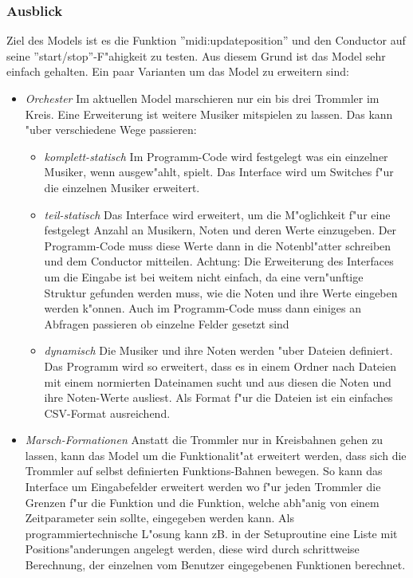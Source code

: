 \subsubsection{Ausblick}
Ziel des Models ist es die Funktion ''midi:updateposition'' und den Conductor
auf seine ''start/stop''-F"ahigkeit zu testen. Aus diesem Grund ist das Model
sehr einfach gehalten. Ein paar Varianten um das Model zu erweitern sind:
\begin{itemize}
\item \emph{Orchester} Im aktuellen Model marschieren nur ein bis drei Trommler
im Kreis. Eine Erweiterung ist weitere Musiker mitspielen zu lassen. Das kann
"uber verschiedene Wege passieren: \begin{itemize}
\item \emph{komplett-statisch} Im Programm-Code wird festgelegt was ein
einzelner Musiker, wenn ausgew"ahlt, spielt. Das Interface wird um Switches f"ur
die einzelnen Musiker erweitert. 
\item \emph{teil-statisch} Das Interface wird erweitert, um die M"oglichkeit 
f"ur eine festgelegt Anzahl an Musikern, Noten und deren Werte einzugeben. Der
Programm-Code muss diese Werte dann in die Notenbl"atter schreiben und dem 
Conductor mitteilen. Achtung: Die Erweiterung des Interfaces um die Eingabe ist
bei weitem nicht einfach, da eine vern"unftige Struktur gefunden werden muss, 
wie die Noten und ihre Werte eingeben werden k"onnen. Auch im Programm-Code muss
dann einiges an Abfragen passieren ob einzelne Felder gesetzt sind
\item \emph{dynamisch} Die Musiker und ihre Noten werden "uber Dateien 
definiert. Das Programm wird so erweitert, dass es in einem Ordner nach Dateien
mit einem normierten Dateinamen sucht und aus diesen die Noten und ihre 
Noten-Werte ausliest. Als Format f"ur die Dateien ist ein einfaches CSV-Format
ausreichend. 
\end{itemize}
\item \emph{Marsch-Formationen} Anstatt die Trommler nur in Kreisbahnen gehen
zu lassen, kann das Model um die Funktionalit"at erweitert werden, dass sich
die Trommler auf selbst definierten Funktions-Bahnen bewegen. So kann das 
Interface um Eingabefelder erweitert werden wo f"ur jeden Trommler die Grenzen
f"ur die Funktion und die Funktion, welche abh"anig von einem Zeitparameter sein
sollte, eingegeben werden kann. Als programmiertechnische L"osung kann zB. in der
Setuproutine eine Liste mit Positions"anderungen angelegt werden, diese wird
durch schrittweise Berechnung, der einzelnen vom Benutzer eingegebenen 
Funktionen berechnet. 
\end{itemize}

